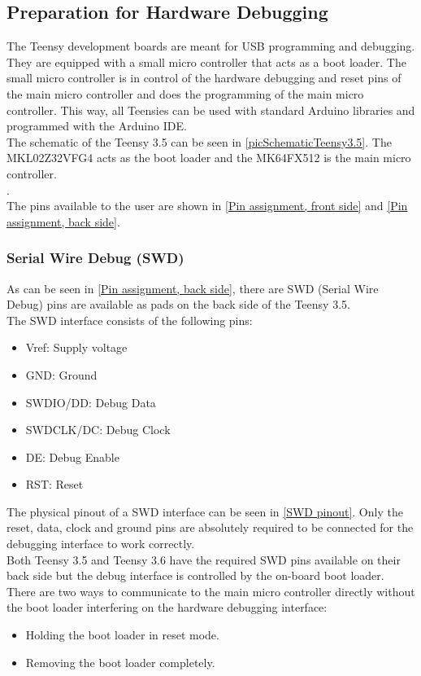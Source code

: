 \subsection{Preparation for Hardware Debugging}
The Teensy development boards are meant for USB programming and debugging. They are equipped with a small micro controller that acts as a boot loader. The small micro controller is in control of the hardware debugging and reset pins of the main micro controller and does the programming of the main micro controller. This way, all Teensies can be used with standard Arduino libraries and programmed with the Arduino IDE. \\
The schematic of the Teensy 3.5 can be seen in \autoref{picSchematicTeensy3.5}. The MKL02Z32VFG4 acts as the boot loader and the MK64FX512 is the main micro controller.\\
.\\
The pins available to the user are shown in \autoref{Pin assignment, front side} and \autoref{Pin assignment, back side}. \\
%
\subsubsection{Serial Wire Debug (SWD)}
As can be seen in \autoref{Pin assignment, back side}, there are SWD (Serial Wire Debug) pins are available as pads on the back side of the Teensy 3.5. \\
The SWD interface consists of the following pins:
\begin{itemize}
    \item Vref: Supply voltage
    \item GND: Ground
    \item SWDIO/DD: Debug Data
    \item SWDCLK/DC: Debug Clock
    \item DE: Debug Enable
    \item RST: Reset
\end{itemize}
The physical pinout of a SWD interface can be seen in \autoref{SWD pinout}. Only the reset, data, clock and ground pins are absolutely required to be connected for the debugging interface to work correctly.\\
Both Teensy 3.5 and Teensy 3.6 have the required SWD pins available on their back side but the debug interface is controlled by the on-board boot loader. \\
There are two ways to communicate to the main micro controller directly without the boot loader interfering on the hardware debugging interface:
\begin{itemize}
    \item Holding the boot loader in reset mode.
    \item Removing the boot loader completely.
\end{itemize}
